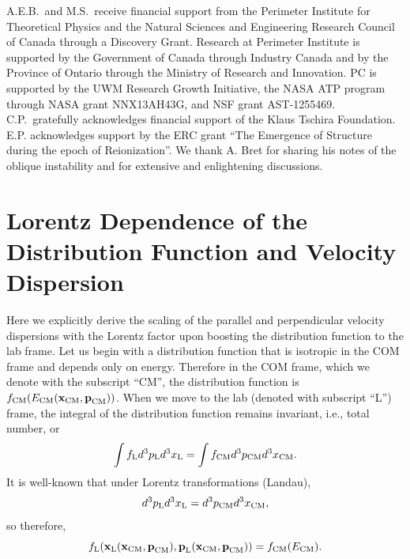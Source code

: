 \documentclass[usenatbib,iop,apj]{emulateapj}
\newcommand\bmath[1] {\mbox{\boldmath$\rm #1$}}
\newcommand{\pmom}{\ensuremath{\bmath{p}}}
\newcommand{\ppos}{\ensuremath{\bmath{x}}}
\newcommand{\fLAB}{\ensuremath{f_{\rm L}}}
\newcommand{\fCM}{\ensuremath{f_{\rm CM}}}
\newcommand{\dVLAB}{\ensuremath{d^3p_{\rm L} d^3x_{\rm L}}}
\newcommand{\dVCM}{\ensuremath{d^3p_{\rm CM} d^3x_{\rm CM}}}
\newcommand{\epm}{\ensuremath{e^+e^-}}
\begin{document}

\acknowledgements
A.E.B.~and M.S.~receive financial support from the Perimeter
Institute for Theoretical Physics and the Natural Sciences and
Engineering Research Council of Canada through a Discovery Grant.
Research at Perimeter Institute is supported by the Government of
Canada through Industry Canada and by the Province of Ontario through
the Ministry of Research and Innovation.
PC is supported by the UWM Research Growth Initiative, the NASA ATP
program through NASA grant NNX13AH43G, and NSF grant AST-1255469.
C.P.~gratefully acknowledges
financial support of the Klaus Tschira Foundation. E.P. acknowledges support by the ERC grant ``The Emergence of Structure during the epoch of Reionization''.
We thank A. Bret for sharing his notes of the oblique instability and for extensive and enlightening discussions. 

\appendix%

\section{Lorentz Dependence of the Distribution Function and Velocity Dispersion}
\label{sec:lorentz}

Here we explicitly derive the scaling of the parallel and
perpendicular velocity dispersions with the Lorentz factor upon boosting the
distribution function to the lab frame. Let us begin with a distribution
function that is isotropic in the COM frame and depends only on energy.
Therefore in the COM frame, which we denote with the subscript ``CM'', the distribution
function is  $\fCM(E_{\rm CM}(\ppos_{\rm CM},\pmom_{\rm CM}))$.  When we move to the lab
(denoted with subscript ``L'') frame, the integral of the distribution function remains invariant,
i.e., total number, or
\begin{equation}
 \int \fLAB \dVLAB = \int \fCM \dVCM.
\end{equation}
It is well-known that under Lorentz transformations (Landau), 
\begin{equation}
 \dVLAB = \dVCM,
\end{equation}
so therefore,
\begin{equation}
  \fLAB(\ppos_{\rm L}(\ppos_{\rm CM},\pmom_{\rm CM}),\pmom_{\rm L}(\ppos_{\rm CM},\pmom_{\rm CM})) = \fCM(E_{\rm CM}).
\end{equation}
\end{document}
